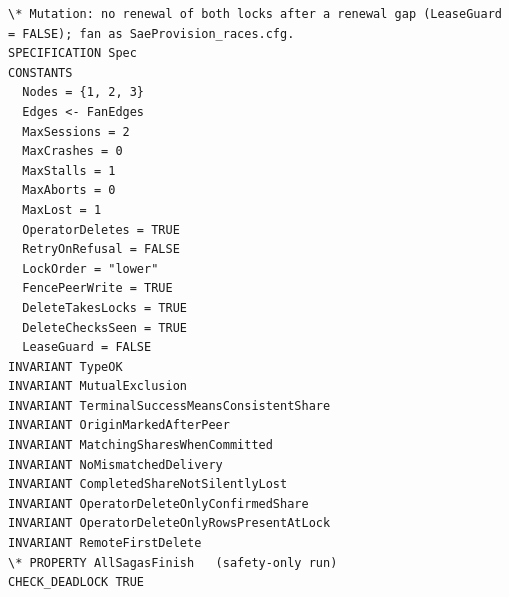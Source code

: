 \documentclass[11pt,a4paper]{article}
\begin{document}
\begin{lstlisting}[float, caption={mutations/mut\_e\_noleaseguard.cfg}, captionpos=t]
\* Mutation: no renewal of both locks after a renewal gap (LeaseGuard = FALSE); fan as SaeProvision_races.cfg.
SPECIFICATION Spec
CONSTANTS
  Nodes = {1, 2, 3}
  Edges <- FanEdges
  MaxSessions = 2
  MaxCrashes = 0
  MaxStalls = 1
  MaxAborts = 0
  MaxLost = 1
  OperatorDeletes = TRUE
  RetryOnRefusal = FALSE
  LockOrder = "lower"
  FencePeerWrite = TRUE
  DeleteTakesLocks = TRUE
  DeleteChecksSeen = TRUE
  LeaseGuard = FALSE
INVARIANT TypeOK
INVARIANT MutualExclusion
INVARIANT TerminalSuccessMeansConsistentShare
INVARIANT OriginMarkedAfterPeer
INVARIANT MatchingSharesWhenCommitted
INVARIANT NoMismatchedDelivery
INVARIANT CompletedShareNotSilentlyLost
INVARIANT OperatorDeleteOnlyConfirmedShare
INVARIANT OperatorDeleteOnlyRowsPresentAtLock
INVARIANT RemoteFirstDelete
\* PROPERTY AllSagasFinish   (safety-only run)
CHECK_DEADLOCK TRUE
\end{lstlisting}
\end{document}
